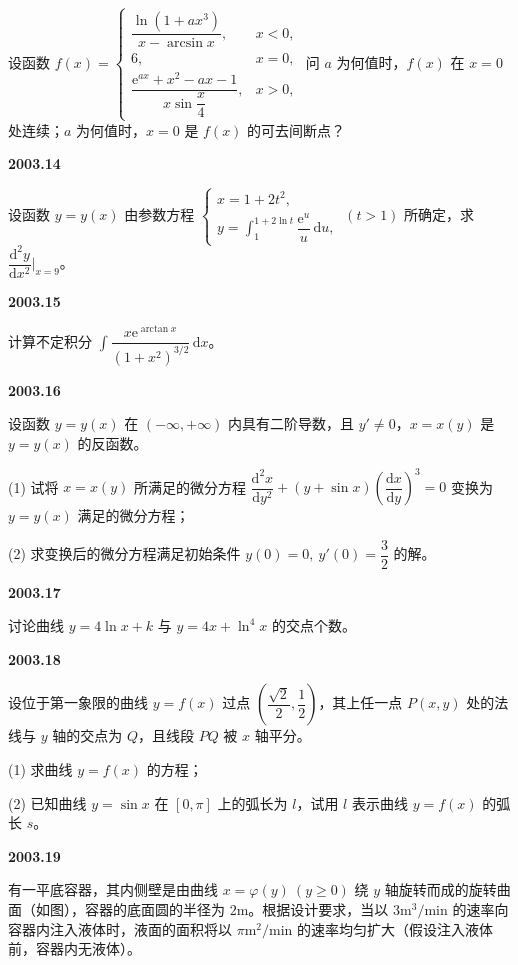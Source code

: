 \documentclass[UTF8,12pt,fontset=windows]{ctexart}
\begin{document}
设函数 $f(x)=\begin{cases}\dfrac{\ln(1+ax^3)}{x-\arcsin x}, & x<0,\\[5pt] 6, & x=0,\\[5pt] \dfrac{\mathrm{e}^{ax}+x^2-ax-1}{x\sin\dfrac{x}{4}}, & x>0,\end{cases}$ 问 $a$ 为何值时，$f(x)$ 在 $x=0$ 处连续；$a$ 为何值时，$x=0$ 是 $f(x)$ 的可去间断点？

\vfill
\newpage
{\large\bfseries 2003.14}

设函数 $y=y(x)$ 由参数方程 $\begin{cases}x=1+2t^2,\\[4pt] y=\displaystyle\int_1^{1+2\ln t}\dfrac{\mathrm{e}^u}{u}\,\mathrm{d}u,\end{cases}\ (t>1)$ 所确定，求 $\dfrac{\mathrm{d}^2y}{\mathrm{d}x^2}\bigg|_{x=9}$。

\vfill
\newpage
{\large\bfseries 2003.15}

计算不定积分 $\displaystyle\int\dfrac{x\mathrm{e}^{\arctan x}}{(1+x^2)^{3/2}}\,\mathrm{d}x$。

\vfill
\newpage
{\large\bfseries 2003.16}

设函数 $y=y(x)$ 在 $(-\infty,+\infty)$ 内具有二阶导数，且 $y'\neq0$，$x=x(y)$ 是 $y=y(x)$ 的反函数。

(1) 试将 $x=x(y)$ 所满足的微分方程 $\dfrac{\mathrm{d}^2x}{\mathrm{d}y^2}+(y+\sin x)\left(\dfrac{\mathrm{d}x}{\mathrm{d}y}\right)^3=0$ 变换为 $y=y(x)$ 满足的微分方程；

(2) 求变换后的微分方程满足初始条件 $y(0)=0,\ y'(0)=\dfrac{3}{2}$ 的解。

\vfill
\newpage
{\large\bfseries 2003.17}

讨论曲线 $y=4\ln x+k$ 与 $y=4x+\ln^4x$ 的交点个数。

\vfill
\newpage
{\large\bfseries 2003.18}

设位于第一象限的曲线 $y=f(x)$ 过点 $\left(\dfrac{\sqrt{2}}{2},\dfrac{1}{2}\right)$，其上任一点 $P(x,y)$ 处的法线与 $y$ 轴的交点为 $Q$，且线段 $PQ$ 被 $x$ 轴平分。

(1) 求曲线 $y=f(x)$ 的方程；

(2) 已知曲线 $y=\sin x$ 在 $[0,\pi]$ 上的弧长为 $l$，试用 $l$ 表示曲线 $y=f(x)$ 的弧长 $s$。

\vfill
\newpage
{\large\bfseries 2003.19}

有一平底容器，其内侧壁是由曲线 $x=\varphi(y)\ (y\ge0)$ 绕 $y$ 轴旋转而成的旋转曲面（如图），容器的底面圆的半径为 $2\mathrm{m}$。根据设计要求，当以 $3\mathrm{m}^3/\mathrm{min}$ 的速率向容器内注入液体时，液面的面积将以 $\pi\mathrm{m}^2/\mathrm{min}$ 的速率均匀扩大（假设注入液体前，容器内无液体）。
\end{document}
